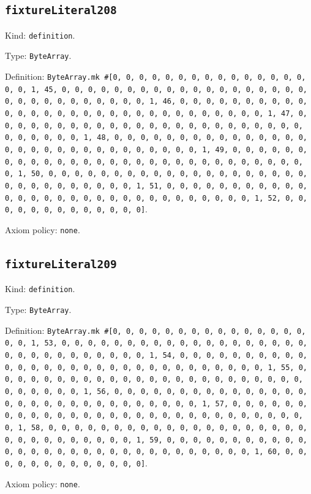 \documentclass[11pt]{article}
\begin{document}
\subsection*{\texttt{fixtureLiteral208}}
\noindent Kind: \texttt{definition}.\par
\noindent Type: \texttt{ByteArray}.\par
\noindent Definition: \texttt{ByteArray.mk \#[0, 0, 0, 0, 0, 0, 0, 0, 0, 0, 0, 0, 0, 0, 0, 0, 0, 1, 45, 0, 0, 0, 0, 0, 0, 0, 0, 0, 0, 0, 0, 0, 0, 0, 0, 0, 0, 0, 0, 0, 0, 0, 0, 0, 0, 0, 0, 0, 0, 1, 46, 0, 0, 0, 0, 0, 0, 0, 0, 0, 0, 0, 0, 0, 0, 0, 0, 0, 0, 0, 0, 0, 0, 0, 0, 0, 0, 0, 0, 0, 0, 1, 47, 0, 0, 0, 0, 0, 0, 0, 0, 0, 0, 0, 0, 0, 0, 0, 0, 0, 0, 0, 0, 0, 0, 0, 0, 0, 0, 0, 0, 0, 0, 1, 48, 0, 0, 0, 0, 0, 0, 0, 0, 0, 0, 0, 0, 0, 0, 0, 0, 0, 0, 0, 0, 0, 0, 0, 0, 0, 0, 0, 0, 0, 0, 1, 49, 0, 0, 0, 0, 0, 0, 0, 0, 0, 0, 0, 0, 0, 0, 0, 0, 0, 0, 0, 0, 0, 0, 0, 0, 0, 0, 0, 0, 0, 0, 1, 50, 0, 0, 0, 0, 0, 0, 0, 0, 0, 0, 0, 0, 0, 0, 0, 0, 0, 0, 0, 0, 0, 0, 0, 0, 0, 0, 0, 0, 0, 0, 1, 51, 0, 0, 0, 0, 0, 0, 0, 0, 0, 0, 0, 0, 0, 0, 0, 0, 0, 0, 0, 0, 0, 0, 0, 0, 0, 0, 0, 0, 0, 0, 1, 52, 0, 0, 0, 0, 0, 0, 0, 0, 0, 0, 0, 0, 0]}.\par
\noindent Axiom policy: \texttt{none}.\par
\subsection*{\texttt{fixtureLiteral209}}
\noindent Kind: \texttt{definition}.\par
\noindent Type: \texttt{ByteArray}.\par
\noindent Definition: \texttt{ByteArray.mk \#[0, 0, 0, 0, 0, 0, 0, 0, 0, 0, 0, 0, 0, 0, 0, 0, 0, 1, 53, 0, 0, 0, 0, 0, 0, 0, 0, 0, 0, 0, 0, 0, 0, 0, 0, 0, 0, 0, 0, 0, 0, 0, 0, 0, 0, 0, 0, 0, 0, 1, 54, 0, 0, 0, 0, 0, 0, 0, 0, 0, 0, 0, 0, 0, 0, 0, 0, 0, 0, 0, 0, 0, 0, 0, 0, 0, 0, 0, 0, 0, 0, 1, 55, 0, 0, 0, 0, 0, 0, 0, 0, 0, 0, 0, 0, 0, 0, 0, 0, 0, 0, 0, 0, 0, 0, 0, 0, 0, 0, 0, 0, 0, 0, 1, 56, 0, 0, 0, 0, 0, 0, 0, 0, 0, 0, 0, 0, 0, 0, 0, 0, 0, 0, 0, 0, 0, 0, 0, 0, 0, 0, 0, 0, 0, 0, 1, 57, 0, 0, 0, 0, 0, 0, 0, 0, 0, 0, 0, 0, 0, 0, 0, 0, 0, 0, 0, 0, 0, 0, 0, 0, 0, 0, 0, 0, 0, 0, 1, 58, 0, 0, 0, 0, 0, 0, 0, 0, 0, 0, 0, 0, 0, 0, 0, 0, 0, 0, 0, 0, 0, 0, 0, 0, 0, 0, 0, 0, 0, 0, 1, 59, 0, 0, 0, 0, 0, 0, 0, 0, 0, 0, 0, 0, 0, 0, 0, 0, 0, 0, 0, 0, 0, 0, 0, 0, 0, 0, 0, 0, 0, 0, 1, 60, 0, 0, 0, 0, 0, 0, 0, 0, 0, 0, 0, 0, 0]}.\par
\noindent Axiom policy: \texttt{none}.\par
\end{document}
